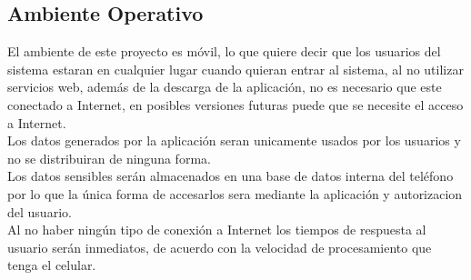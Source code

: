 \documentclass[12pt]{article}
\begin{document}
\subsection{Ambiente Operativo}

El ambiente de este proyecto es m\'ovil, lo que quiere decir que los usuarios del sistema estaran en cualquier lugar cuando quieran entrar al sistema, al no utilizar servicios web, adem\'as de la descarga de la aplicaci\'on, no es necesario que este conectado a Internet, en posibles versiones futuras puede que se necesite el acceso a Internet.\\ 
Los datos generados por la aplicaci\'on seran unicamente usados por los usuarios y no se distribuiran de ninguna forma.\\
Los datos sensibles ser\'an almacenados en una base de datos interna del tel\'efono por lo que la \'unica forma de accesarlos sera mediante la aplicaci\'on y autorizacion del usuario.\\
Al no haber ning\'un tipo de conexi\'on a Internet los tiempos de respuesta al usuario ser\'an inmediatos, de acuerdo con la velocidad de procesamiento que tenga el celular.

\newpage
\end{document}
